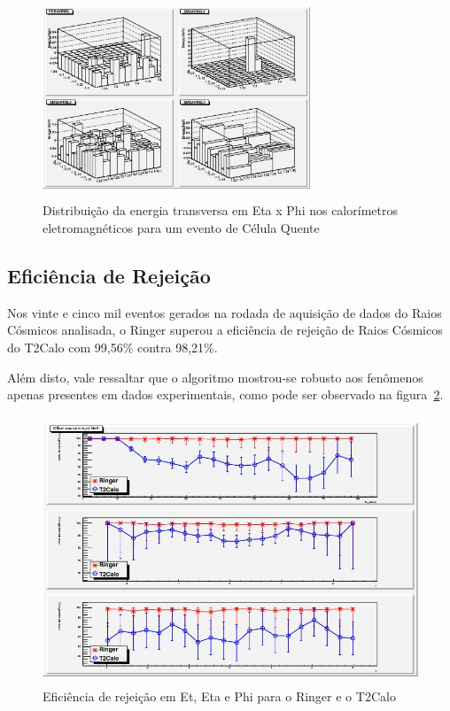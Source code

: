 \documentclass[a4paper,10pt,titlepage]{article}
\begin{document}
\begin{figure}[htbp!]
 \centering
 \includegraphics[width=8cm,height=6cm]{Figs/cosmics/rc_hot_em1.eps}
 \caption{Distribuição da energia transversa em Eta x Phi nos calorímetros eletromagnéticos para um evento de Célula Quente}
 \label{fig:rc_hot_em1}
\end{figure}

\subsection{Eficiência de Rejeição}

Nos vinte e cinco mil eventos gerados na rodada de aquisição de dados do Raios Cósmicos analisada, o Ringer superou a eficiência de rejeição de Raios Cósmicos do T2Calo com 99,56\% contra 98,21\%.

Além disto, vale ressaltar que o algoritmo mostrou-se robusto aos fenômenos apenas presentes em dados experimentais, como pode ser observado na figura~\ref{fig:cosmics_rejection_effics}.

\begin{figure}[htbp!]
 \centering
 \includegraphics[width=12cm,height=8cm]{Figs/cosmics/cosmics_rejection_effics.jpg}
 \caption{Eficiência de rejeição em Et, Eta e Phi para o Ringer e o T2Calo}
 \label{fig:cosmics_rejection_effics}
\end{figure}
\end{document}

